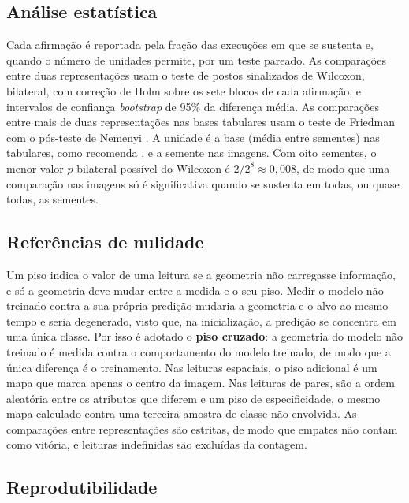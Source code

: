 \subsection{Análise estatística}\label{subsec:estatistica}

Cada afirmação é reportada pela fração das execuções em que se sustenta e, quando o número de unidades permite, por um teste pareado. As comparações entre duas representações usam o teste de postos sinalizados de Wilcoxon, bilateral, com correção de Holm sobre os sete blocos de cada afirmação, e intervalos de confiança \textit{bootstrap} de 95\% da diferença média. As comparações entre mais de duas representações nas bases tabulares usam o teste de Friedman com o pós-teste de Nemenyi \citep{Demsar2006}. A unidade é a base (média entre sementes) nas tabulares, como recomenda \citet{Demsar2006}, e a semente nas imagens. Com oito sementes, o menor valor-$p$ bilateral possível do Wilcoxon é $2/2^8 \approx 0{,}008$, de modo que uma comparação nas imagens só é significativa quando se sustenta em todas, ou quase todas, as sementes.

\subsection{Referências de nulidade}\label{subsec:pisos}

Um piso indica o valor de uma leitura se a geometria não carregasse informação, e só a geometria deve mudar entre a medida e o seu piso. Medir o modelo não treinado contra a sua própria predição mudaria a geometria e o alvo ao mesmo tempo e seria degenerado, visto que, na inicialização, a predição se concentra em uma única classe. Por isso é adotado o \textbf{piso cruzado}: a geometria do modelo não treinado é medida contra o comportamento do modelo treinado, de modo que a única diferença é o treinamento. Nas leituras espaciais, o piso adicional é um mapa que marca apenas o centro da imagem. Nas leituras de pares, são a ordem aleatória entre os atributos que diferem e um piso de especificidade, o mesmo mapa calculado contra uma terceira amostra de classe não envolvida. As comparações entre representações são estritas, de modo que empates não contam como vitória, e leituras indefinidas são excluídas da contagem.

\subsection{Reprodutibilidade}\label{subsec:reprodutibilidade}

